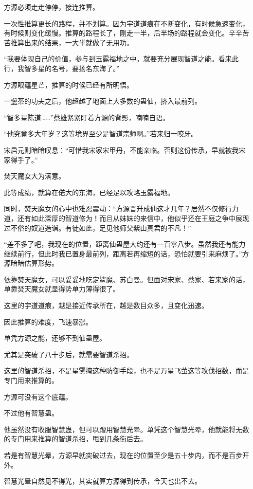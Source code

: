 \begin{this_body}
方源必须走走停停，接连推算。

一次性推算更长的路程，并不划算。因为宇道道痕在不断变化，有时候急速变化，有时候则变化缓慢。推算的路程长了，刚走一半，后半场的路程就会变化。辛辛苦苦推算出来的结果，一大半就做了无用功。

“我要体现自己的价值，参与到玉露福地之中，就要充分展现智道之能。看来此行，我智多星的名号，要扬名东海了。”

方源眼蕴星芒，推算的时候已经有所明悟。

一盏茶的功夫之后，他超越了地面上大多数的蛊仙，挤入最前列。

“智多星陈道……”蔡雄紧紧盯着方源的背影，喃喃自语。

“他究竟多大年岁？这等境界至少是智道宗师啊。”若来归一咬牙。

宋启元则暗暗叹息：“可惜我宋家宋甲丹，不能亲临。否则这份传承，早就被我宋家得手了。”

焚天魔女大为满意。

此等成绩，就算在偌大的东海，已经足以攻略玉露福地。

同时，焚天魔女的心中也难忍震动：“方源晋升成仙这才几年？居然不仅修行力道，还有如此深厚的智道修为！而且从妹妹的来信中，他似乎还在王庭之争中展现过不俗的奴道造诣。有徒如此，足见他师父紫山真君的不凡！”

“差不多了吧，我现在的位置，距离仙蛊屋大约还有一百零八步。虽然我还有能力继续前行，但此时我已置身最前列，距离若再缩短的话，恐怕就要引来麻烦了。”方源暗暗估算形势。

依靠焚天魔女，可以妥妥地吃定鲨魔、苏白曼。但面对宋家、蔡家、若来家的话，单靠焚天魔女就显得势单力薄得很了。

这里的宇道道痕，越是接近传承所在，越是数目众多，且变化迅速。

因此推算的难度，飞速暴涨。

单凭方源之能，还够不到仙蛊屋。

尤其是突破了八十步后，就需要智道杀招。

这里的智道杀招，不是星雾掩这种防御手段，也不是万星飞萤这等攻伐招数，而是专门用来推算的。

方源可没有这个底蕴。

不过他有智慧蛊。

他虽然没有收服智慧蛊，但可以蹭用智慧光晕。单凭这个智慧光晕，他就能将无数的专门用来推算的智道杀招，甩到几条街后去。

若是有智慧光晕，方源早就突破过去，现在的位置至少是五十步内，而不是百步开外。

智慧光晕自然见不得光，其实就算方源得到传承，今天也出不去。


\end{this_body}
